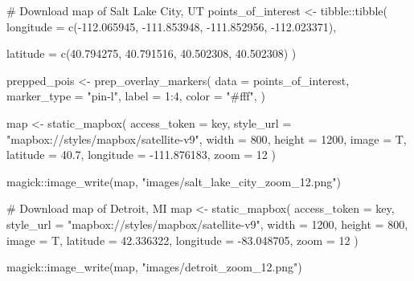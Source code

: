 \documentclass[
  letterpaper,
  DIV=11,
  numbers=noendperiod]{scrreprt}
\newenvironment{Shaded}{\begin{snugshade}}{\end{snugshade}}
\newcommand{\AttributeTok}[1]{\textcolor[rgb]{0.40,0.45,0.13}{#1}}
\newcommand{\CommentTok}[1]{\textcolor[rgb]{0.37,0.37,0.37}{#1}}
\newcommand{\DecValTok}[1]{\textcolor[rgb]{0.68,0.00,0.00}{#1}}
\newcommand{\FloatTok}[1]{\textcolor[rgb]{0.68,0.00,0.00}{#1}}
\newcommand{\FunctionTok}[1]{\textcolor[rgb]{0.28,0.35,0.67}{#1}}
\newcommand{\NormalTok}[1]{\textcolor[rgb]{0.00,0.23,0.31}{#1}}
\newcommand{\OtherTok}[1]{\textcolor[rgb]{0.00,0.23,0.31}{#1}}
\newcommand{\SpecialCharTok}[1]{\textcolor[rgb]{0.37,0.37,0.37}{#1}}
\newcommand{\StringTok}[1]{\textcolor[rgb]{0.13,0.47,0.30}{#1}}
\begin{document}
\begin{Shaded}
\begin{Highlighting}[]
\CommentTok{\# Download map of Salt Lake City, UT}
\NormalTok{points\_of\_interest }\OtherTok{\textless{}{-}}\NormalTok{ tibble}\SpecialCharTok{::}\FunctionTok{tibble}\NormalTok{(}
  \AttributeTok{longitude =} \FunctionTok{c}\NormalTok{(}\SpecialCharTok{{-}}\FloatTok{112.065945}\NormalTok{, }\SpecialCharTok{{-}}\FloatTok{111.853948}\NormalTok{, }
                \SpecialCharTok{{-}}\FloatTok{111.852956}\NormalTok{, }\SpecialCharTok{{-}}\FloatTok{112.023371}\NormalTok{),}
  
  \AttributeTok{latitude =} \FunctionTok{c}\NormalTok{(}\FloatTok{40.794275}\NormalTok{, }\FloatTok{40.791516}\NormalTok{, }
               \FloatTok{40.502308}\NormalTok{, }\FloatTok{40.502308}\NormalTok{)}
\NormalTok{  )}

\NormalTok{prepped\_pois }\OtherTok{\textless{}{-}} \FunctionTok{prep\_overlay\_markers}\NormalTok{(}
  \AttributeTok{data =}\NormalTok{ points\_of\_interest,}
  \AttributeTok{marker\_type =} \StringTok{"pin{-}l"}\NormalTok{,}
  \AttributeTok{label =} \DecValTok{1}\SpecialCharTok{:}\DecValTok{4}\NormalTok{,}
  \AttributeTok{color =} \StringTok{"\#fff"}\NormalTok{, }
\NormalTok{)}

\NormalTok{map }\OtherTok{\textless{}{-}} \FunctionTok{static\_mapbox}\NormalTok{(}
  \AttributeTok{access\_token =}\NormalTok{ key,}
  \AttributeTok{style\_url =} \StringTok{"mapbox://styles/mapbox/satellite{-}v9"}\NormalTok{,}
  \AttributeTok{width =} \DecValTok{800}\NormalTok{,}
  \AttributeTok{height =} \DecValTok{1200}\NormalTok{, }
  \AttributeTok{image =}\NormalTok{ T, }
  \AttributeTok{latitude =} \FloatTok{40.7}\NormalTok{,}
  \AttributeTok{longitude =} \SpecialCharTok{{-}}\FloatTok{111.876183}\NormalTok{, }\AttributeTok{zoom =} \DecValTok{12}
\NormalTok{)}

\NormalTok{magick}\SpecialCharTok{::}\FunctionTok{image\_write}\NormalTok{(map, }\StringTok{"images/salt\_lake\_city\_zoom\_12.png"}\NormalTok{)}
\end{Highlighting}
\end{Shaded}

\begin{Shaded}
\begin{Highlighting}[]
\CommentTok{\# Download map of Detroit, MI}
\NormalTok{map }\OtherTok{\textless{}{-}} \FunctionTok{static\_mapbox}\NormalTok{(}
  \AttributeTok{access\_token =}\NormalTok{ key,}
  \AttributeTok{style\_url =} \StringTok{"mapbox://styles/mapbox/satellite{-}v9"}\NormalTok{,}
  \AttributeTok{width =} \DecValTok{1200}\NormalTok{,}
  \AttributeTok{height =} \DecValTok{800}\NormalTok{, }
  \AttributeTok{image =}\NormalTok{ T, }
  \AttributeTok{latitude =} \FloatTok{42.336322}\NormalTok{,}
  \AttributeTok{longitude =} \SpecialCharTok{{-}}\FloatTok{83.048705}\NormalTok{, }\AttributeTok{zoom =} \DecValTok{12}
\NormalTok{)}

\NormalTok{magick}\SpecialCharTok{::}\FunctionTok{image\_write}\NormalTok{(map, }\StringTok{"images/detroit\_zoom\_12.png"}\NormalTok{)}
\end{Highlighting}
\end{Shaded}
\end{document}
